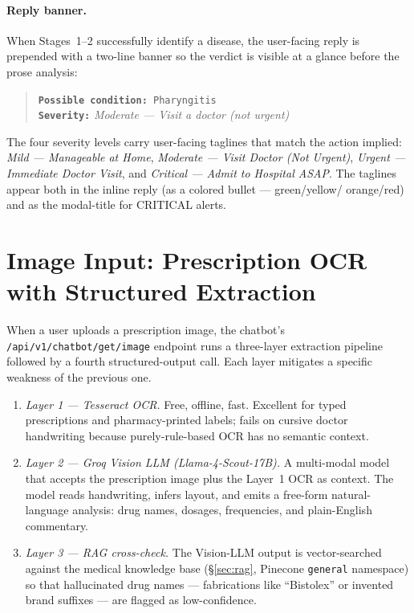 \documentclass[12pt]{caltech_thesis}
\begin{document}
\paragraph{Reply banner.} When Stages~1--2 successfully identify a
disease, the user-facing reply is prepended with a two-line banner so
the verdict is visible at a glance before the prose analysis:
\begin{quote}\small
\texttt{\textbf{Possible condition:} Pharyngitis} \\
\texttt{\textbf{Severity:}} \emph{Moderate --- Visit a doctor (not urgent)}
\end{quote}
The four severity levels carry user-facing taglines that match the
action implied: \textit{Mild --- Manageable at Home}, \textit{Moderate
--- Visit Doctor (Not Urgent)}, \textit{Urgent --- Immediate Doctor
Visit}, and \textit{Critical --- Admit to Hospital ASAP}. The taglines
appear both in the inline reply (as a colored bullet --- green/yellow/
orange/red) and as the modal-title for CRITICAL alerts.

\section{Image Input: Prescription OCR with Structured Extraction}
\label{sec:image-input}

When a user uploads a prescription image, the chatbot's
\texttt{/api/v1/chatbot/get/image} endpoint runs a three-layer
extraction pipeline followed by a fourth structured-output call. Each
layer mitigates a specific weakness of the previous one.

\begin{enumerate}
    \item \textit{Layer 1 --- Tesseract OCR.} Free, offline, fast.
    Excellent for typed prescriptions and pharmacy-printed labels;
    fails on cursive doctor handwriting because purely-rule-based OCR
    has no semantic context.
    \item \textit{Layer 2 --- Groq Vision LLM
    (Llama-4-Scout-17B).} A multi-modal model that accepts the
    prescription image plus the Layer~1 OCR as context. The model
    reads handwriting, infers layout, and emits a free-form natural-
    language analysis: drug names, dosages, frequencies, and
    plain-English commentary.
    \item \textit{Layer 3 --- RAG cross-check.} The Vision-LLM
    output is vector-searched against the medical knowledge base
    (\S\ref{sec:rag}, Pinecone \texttt{general} namespace) so that
    hallucinated drug names --- fabrications like ``Bistolex'' or
    invented brand suffixes --- are flagged as low-confidence.
\end{enumerate}
\end{document}
